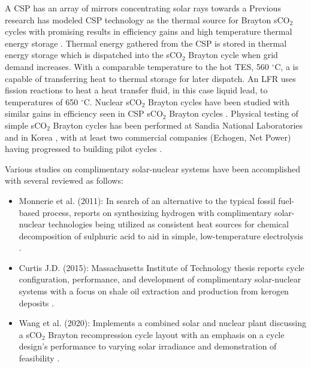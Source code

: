 A CSP has an array of mirrors concentrating solar rays towards a  Previous research has modeled CSP technology as the thermal source for Brayton sCO$_2$ cycles with promising results in efficiency gains and high temperature thermal energy storage \cite{turchi_2013, iverson_2013, ho_2015, wang_2018, neises_2020}. Thermal energy gathered from the CSP is stored in thermal energy storage which is dispatched into the sCO$_2$ Brayton cycle when grid demand increases. With a comparable temperature to the hot TES, 560 $^{\circ}$C, a  is capable of transferring heat to thermal storage for later dispatch. An LFR uses fission reactions to heat a heat transfer fluid, in this case liquid lead, to temperatures of 650 $^{\circ}$C. Nuclear sCO$_2$ Brayton cycles have been studied with similar gains in efficiency seen in CSP sCO$_2$ Brayton cycles \cite{ dostal_2004, luo_2020}. Physical testing of simple sCO$_2$ Brayton cycles has been performed at Sandia National Laboratories \cite{wright_2011} and in Korea \cite{cha_2016}, with at least two commercial companies (Echogen, Net Power) having progressed to building pilot cycles  \cite{held_2015,fetvedt_2016}. 

Various studies on complimentary solar-nuclear systems have been accomplished with several reviewed as follows: 

\begin{itemize}
    \item	Monnerie et al. (2011): In search of an alternative to the typical fossil fuel-based process, reports on synthesizing hydrogen with complimentary solar-nuclear technologies being utilized as consistent heat sources for chemical decomposition of sulphuric acid to aid in simple, low-temperature electrolysis \cite{monnerie_2011}. 
    \item   Curtis J.D. (2015): Massachusetts Institute of Technology thesis reports cycle configuration, performance, and development of complimentary solar-nuclear systems with a focus on shale oil extraction and production from kerogen deposits \cite{curtis_2015}. 
    \item   Wang et al. (2020): Implements a combined solar and nuclear plant discussing a sCO$_2$ Brayton recompression cycle layout with an emphasis on a cycle design's performance to varying solar irradiance and demonstration of feasibility \cite{wang_2020}. 
\end{itemize}


